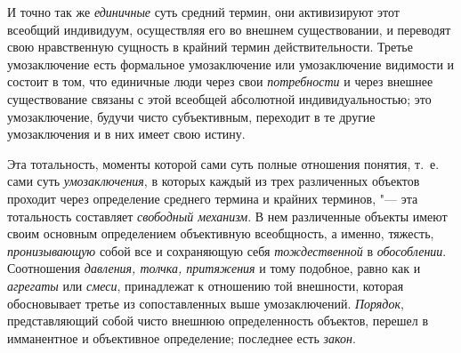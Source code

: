 И точно так же
{\em единичные} суть
средний термин, они активизируют этот всеобщий индивидуум, осуществляя его
во внешнем существовании, и переводят свою нравственную сущность в крайний
термин
действительности.
Третье умозаключение есть формальное умозаключение или
умозаключение видимости и состоит в том, что единичные люди через свои
{\em потребности} и через
внешнее существование связаны с этой всеобщей абсолютной индивидуальностью;
это умозаключение, будучи чисто субъективным, переходит в те другие
умозаключения и в них имеет свою
истину\label{bkm:bm52c}.

Эта тотальность, моменты которой сами суть полные отношения
понятия, т.~е. сами суть
{\em умозаключения}, в
которых каждый из трех различенных объектов проходит через определение
среднего термина и крайних терминов, "--- эта тотальность
составляет {\em свободный механизм}.
В нем различенные объекты имеют своим основным определением
объективную всеобщность, а именно, тяжесть,
{\em пронизывающую} собой
все и сохраняющую себя
{\em тождественной} в
{\em обособлении}.
Соотношения {\em давления,
толчка, притяжения} и тому подобное, равно как и
{\em агрегаты} или
{\em смеси}, принадлежат
к отношению той внешности, которая обосновывает третье из
сопоставленных выше умозаключений.
{\em Порядок},
представляющий собой чисто внешнюю определенность объектов,
перешел в имманентное и объективное определение; последнее есть
{\em закон}.

